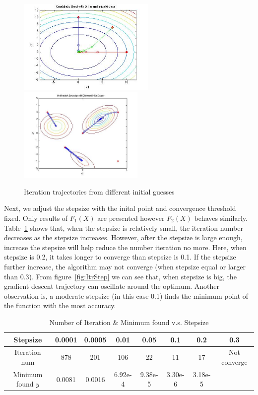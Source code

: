 \begin{figure}[h]
 \centering
\includegraphics[height=1.8in]{figures/p1_QualdraticBowlWDifferenrtInitial} 
\includegraphics[height=1.8in]{figures/p1_MultivarianGaussianWDifferenrtInitial} 
    \caption{Iteration trajectories from different initial guesses}
    \label{fig:Itr}
\end{figure}

Next, we adjust the stepsize with the inital point and convergence threshold fixed. Only results of $F_1(X)$ are presented however $F_2(X)$ behaves similarly. Table~\ref{tab:ItrStep} shows that, when the stepsize is relatively small, the iteration number decreases as the stepsize increases. However, after the stepsize is large enough, increase the stepsize will help reduce the number iteration no more. Here, when stepsize is 0.2, it takes longer to converge than stepsize is 0.1. If the stepsize further increase, the algorithm may not converge (when stepsize equal or larger than 0.3). From figure~\ref{fig:ItrStep} we can see that, when stepsize is big, the gradient descent trajectory can oscillate around the optimum. Another observation is, a moderate stepsize (in this case 0.1) finds the minimum point of the function with the most accuracy. 

\begin{table}[h]
\centering
\caption{Number of Iteration \& Minimum found v.s. Stepsize} \label{tab:ItrStep} 
\begin{tabular}{ | c | c | c | c | c | c | c | c |  }
\hline 
Stepsize & 0.0001 & 0.0005 & 0.01 & 0.05 & 0.1 & 0.2 & 0.3 \\
\hline 
Iteration num & 878 & 201 & 106 & 22 & 11 & 17 & Not converge \\
\hline
Minimum found $y$ & 0.0081 & 0.0016 & 6.92e-4&9.38e-5 & 3.30e-6 & 3.18e-5\\
\hline
\end{tabular}
\end{table}

